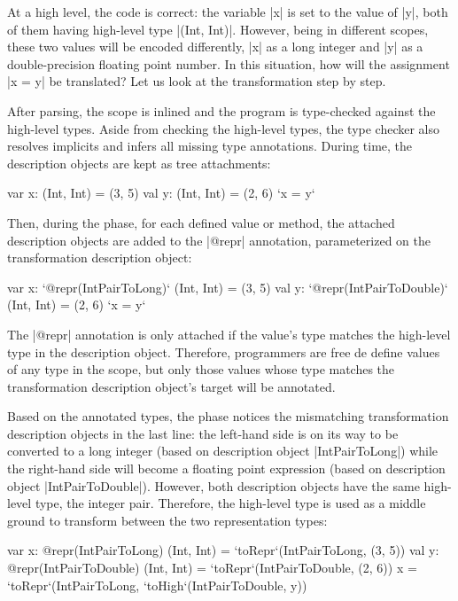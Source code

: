 At a high level, the code is correct: the variable |x| is set to the value of |y|, both of them having high-level type |(Int, Int)|. However, being in different scopes, these two values will be encoded differently, |x| as a long integer and |y| as a double-precision floating point number. In this situation, how will the assignment |x = y| be translated? Let us look at the transformation step by step.

After parsing, the scope is inlined and the program is type-checked against the high-level types. Aside from checking the high-level types, the type checker also resolves implicits and infers all missing type annotations. During time, the description objects are kept as tree attachments:

\begin{lstlisting-nobreak}
var x: (Int, Int) = (3, 5)
val y: (Int, Int) = (2, 6)
`x = y`
\end{lstlisting-nobreak}

Then, during the \inject{} phase, for each defined value or method, the attached description objects are added to the |@repr| annotation, parameterized on the transformation description object:

\begin{lstlisting-nobreak}
var x: `@repr(IntPairToLong)` (Int, Int) = (3, 5)
val y: `@repr(IntPairToDouble)` (Int, Int) = (2, 6)
`x = y`
\end{lstlisting-nobreak}

The |@repr| annotation is only attached if the value's type matches the high-level type in the description object. Therefore, programmers are free de define values of any type in the scope, but only those values whose type matches the transformation description object's target will be annotated.

Based on the annotated types, the \coerce{} phase notices the mismatching transformation description objects in the last line: the left-hand side is on its way to be converted to a long integer (based on description object |IntPairToLong|) while the right-hand side will become a floating point expression (based on description object |IntPairToDouble|). However, both description objects have the same high-level type, the integer pair. Therefore, the high-level type is used as a middle ground to transform between the two representation types:

\begin{lstlisting-nobreak}
var x: @repr(IntPairToLong) (Int, Int) = `toRepr`(IntPairToLong, (3, 5))
val y: @repr(IntPairToDouble) (Int, Int) = `toRepr`(IntPairToDouble, (2, 6))
x = `toRepr`(IntPairToLong, `toHigh`(IntPairToDouble, y))
\end{lstlisting-nobreak}

